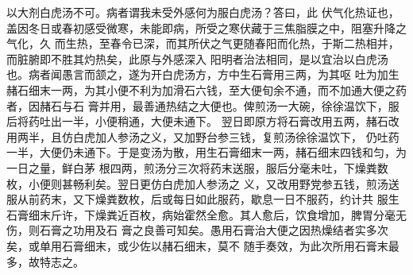 \documentclass[a4paper,12pt,UTF8,twoside]{ctexbook}
\begin{document}
以大剂白虎汤不可。病者谓我未受外感何为服白虎汤？答曰，此 
伏气化热证也，盖因冬日或春初感受微寒，未能即病，所受之寒伏藏于三焦脂膜之中，阻塞升降之气化，久 
而生热，至春令已深，而其所伏之气更随春阳而化热，于斯二热相并，而脏腑即不胜其灼热矣，此原与外感深入 
阳明者治法相同，是以宜治以白虎汤也。病者闻愚言而颔之，遂为开白虎汤方，方中生石膏用三两，为其呕 
吐为加生赭石细末一两，为其小便不利为加滑石六钱，至大便旬余不通，而不加通大便之药者，因赭石与石 
膏并用，最善通热结之大便也。俾煎汤一大碗，徐徐温饮下，服后将药吐出一半，小便稍通，大便未通下。 
翌日即原方将石膏改用五两，赭石改用两半，且仿白虎加人参汤之义，又加野台参三钱，复煎汤徐徐温饮下， 
仍吐药一半，大便仍未通下。于是变汤为散，用生石膏细末一两，赭石细末四钱和匀，为一日之量，鲜白茅 
根四两，煎汤分三次将药末送服，服后分毫未吐，下燥粪数枚，小便则甚畅利矣。翌日更仿白虎加人参汤之 
义，又改用野党参五钱，煎汤送服从前药末，又下燥粪数枚，后或每日如此服药，歇息一日不服药，约计共 
服生石膏细末斤许，下燥粪近百枚，病始霍然全愈。其人愈后，饮食增加，脾胃分毫无伤，则石膏之功用及石 
膏之良善可知矣。愚用石膏治大便之因热燥结者实多次矣，或单用石膏细末，或少佐以赭石细末，莫不 
随手奏效，为此次所用石膏末最多，故特志之。 
\end{document}
